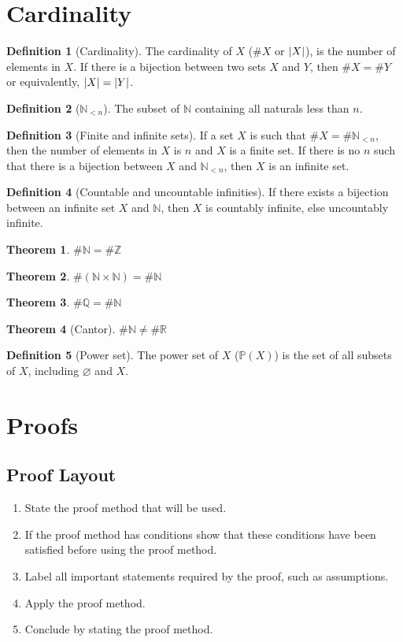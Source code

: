\documentclass{article}
\let\emptyset\varnothing
\theoremstyle{plain}
\newtheorem{theorem}{Theorem}[section]
\numberwithin{theorem}{section}
\theoremstyle{definition}
\newtheorem{definition}{Definition}[section]
\numberwithin{definition}{section}
\newcommand*{\N}{\mathbb{N}}
\newcommand*{\Z}{\mathbb{Z}}
\newcommand*{\Q}{\mathbb{Q}}
\newcommand*{\R}{\mathbb{R}}
\begin{document}
\section{Cardinality}
\begin{definition}[Cardinality]
    The cardinality of $X$ ($\#X$ or $\abs{X}$), is the number of elements in $X$.
    If there is a bijection between two sets $X$ and $Y$,
    then $\#X=\#Y$ or equivalently, $\abs{X} = \abs{Y}$.
\end{definition}
%
\begin{definition}[$\N_{<n}$]
    The subset of $\N$ containing all naturals less than $n$.
\end{definition}
%
\begin{definition}[Finite and infinite sets]
    If a set $X$ is such that $\#X=\#\N_{<n}$,
    then the number of elements in $X$ is $n$ and $X$ is a finite set.
    If there is no $n$ such that there is a bijection between $X$ and $\N_{<n}$,
    then $X$ is an infinite set.
\end{definition}
%
\begin{definition}[Countable and uncountable infinities]
    If there exists a bijection between an infinite set $X$ and $\N$,
    then $X$ is countably infinite, else uncountably infinite.
\end{definition}
%
\begin{theorem}$\#\N = \#\Z$\end{theorem}
\begin{theorem}$\#(\N\times\N) = \#\N$\end{theorem}
\begin{theorem}$\#\Q = \#\N$\end{theorem}
\begin{theorem}[Cantor]$\#\N \ne \#\R$\end{theorem}
%
\begin{definition}[Power set]
    The power set of $X$ ($\mathbb{P}(X)$) is the set of all subsets of $X$,
    including $\emptyset$ and $X$.
\end{definition}
%
\section{Proofs}
\subsection{Proof Layout}
\begin{enumerate}
    \item State the proof method that will be used.
    \item If the proof method has conditions show that these conditions have been satisfied before using the proof method.
    \item Label all important statements required by the proof, such as assumptions.
    \item Apply the proof method.
    \item Conclude by stating the proof method.
\end{enumerate}
%
\end{document}
